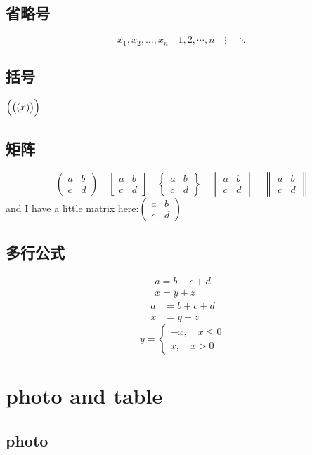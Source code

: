 \documentclass[UTF8]{ctexart}
\begin{document}
\subsection{省略号}
\[ x_1,x_2,\dots ,x_n\quad 1,2,\cdots ,n\quad
\vdots\quad \ddots \]
\subsection{括号}
$\Bigl(\bigl((x)\bigr)\Bigr)$
\subsection{矩阵}
\[ \begin{pmatrix} a&b\\c&d \end{pmatrix} \quad
\begin{bmatrix} a&b\\c&d \end{bmatrix} \quad
\begin{Bmatrix} a&b\\c&d \end{Bmatrix} \quad
\begin{vmatrix} a&b\\c&d \end{vmatrix} \quad
\begin{Vmatrix} a&b\\c&d \end{Vmatrix} \]
and I have a little matrix here:$(\begin{smallmatrix} a&b\\c&d 
\end{smallmatrix}) $
\subsection{多行公式}
\begin{gather}
    a = b+c+d \\
    x = y+z
\end{gather}
\begin{align}
    a &= b+c+d \\
    x &= y+z
\end{align}
\[ y= \begin{cases}
    -x,\quad x\leq 0 \\
    x,\quad x>0
\end{cases} \]
\section{photo and table}
\subsection{photo}
\end{document}
